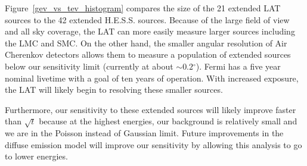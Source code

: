 \documentclass[12pt,preprint]{aastex}
\newcommand{\tev}{\text{TeV}\xspace}
\renewcommand{\deg}{\ensuremath{^\circ}\xspace}
\renewcommand{\approx}{\sim\!\xspace}
\begin{document}
Figure~\ref{gev_vs_tev_histogram} compares the size of the 21 extended
LAT sources to the 42 extended H.E.S.S. sources.  Because of the large
field of view and all sky coverage, the LAT can more easily measure
larger sources including the LMC and SMC.  On the other hand, the
smaller angular resolution of Air Cherenkov detectors allows them to
measure a population of extended sources below our sensitivity limit
(currently at about $\approx0.2\deg$).  Fermi has a five year nominal
livetime with a goal of ten years of operation. With increased exposure,
the LAT will likely begin to resolving these smaller \tev sources.

Furthermore, our sensitivity to these extended sources will likely improve
faster than $\sqrt{t}$ because at the highest energies, our background is
relatively small and we are in the Poisson instead of Gaussian limit.
Future improvements in the diffuse emission model will improve our
sensitivity by allowing this analysis to go to lower energies.



\end{document}
